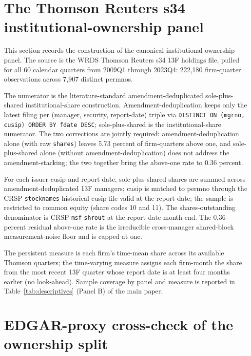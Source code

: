 \documentclass[12pt]{article}
\begin{document}
\section{The Thomson Reuters s34 institutional-ownership panel}
\label{ia:thomson}

This section records the construction of the canonical institutional-ownership panel. The source is the WRDS Thomson Reuters s34 13F holdings file, pulled for all 60 calendar quarters from 2009Q1 through 2023Q4: 222,180 firm-quarter observations across 7,907 distinct permnos.

The numerator is the literature-standard amendment-deduplicated sole-plus-shared institutional-share construction. Amendment-deduplication keeps only the latest filing per (manager, security, report-date) triple via \texttt{DISTINCT ON (mgrno, cusip) ORDER BY fdate DESC}; sole-plus-shared is the institutional-share numerator. The two corrections are jointly required: amendment-deduplication alone (with raw \texttt{shares}) leaves 5.73 percent of firm-quarters above one, and sole-plus-shared alone (without amendment-deduplication) does not address the amendment-stacking; the two together bring the above-one rate to 0.36 percent.

For each issuer cusip and report date, sole-plus-shared shares are summed across amendment-deduplicated 13F managers; cusip is matched to permno through the CRSP \texttt{stocknames} historical-cusip file valid at the report date; the sample is restricted to common equity (share codes 10 and 11). The shares-outstanding denominator is CRSP \texttt{msf} \texttt{shrout} at the report-date month-end. The 0.36-percent residual above-one rate is the irreducible cross-manager shared-block measurement-noise floor and is capped at one.

The persistent measure is each firm's time-mean share across its available Thomson quarters; the time-varying measure assigns each firm-month the share from the most recent 13F quarter whose report date is at least four months earlier (no look-ahead). Sample coverage by panel and measure is reported in Table~\ref{tab:descriptives} (Panel B) of the main paper.

\section{EDGAR-proxy cross-check of the ownership split}
\label{ia:edgar}
\end{document}
